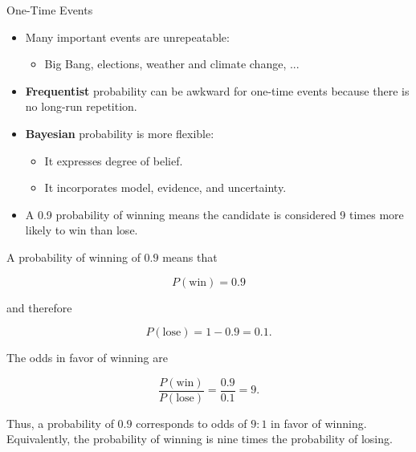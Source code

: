 \documentclass[12pt]{beamer}
\newcommand{\vocab}[1]{\textcolor{AggieMaroon}{\textbf{#1}}}
\begin{document}
\begin{frame}{}
\begin{block}{One-Time Events}
\begin{itemize}
\item Many important events are unrepeatable:

\begin{itemize}
\item[] Big Bang, elections, weather and climate change, ...
\end{itemize}

\item \vocab{Frequentist} probability can be awkward for one-time events because there is no long-run repetition.
\item \vocab{Bayesian} probability is more flexible:

\begin{itemize}
\item It expresses degree of belief.
\item It incorporates model, evidence, and uncertainty.
\end{itemize}
\end{itemize}
\end{block}

\begin{itemize}
\item A 0.9 probability of winning means the candidate is considered 9 times more likely to win than lose.
\end{itemize}

\end{frame}

\begin{frame}{}
A probability of winning of \(0.9\) means that

\[
P(\text{win}) = 0.9
\]

and therefore

\[
P(\text{lose}) = 1 - 0.9 = 0.1.
\]

The odds in favor of winning are

\[
\frac{P(\text{win})}{P(\text{lose})}
=
\frac{0.9}{0.1}
=
9.
\]

Thus, a probability of \(0.9\) corresponds to odds of \(9:1\) in favor of winning.
Equivalently, the probability of winning is nine times the probability of losing.
\end{frame}
\end{document}
